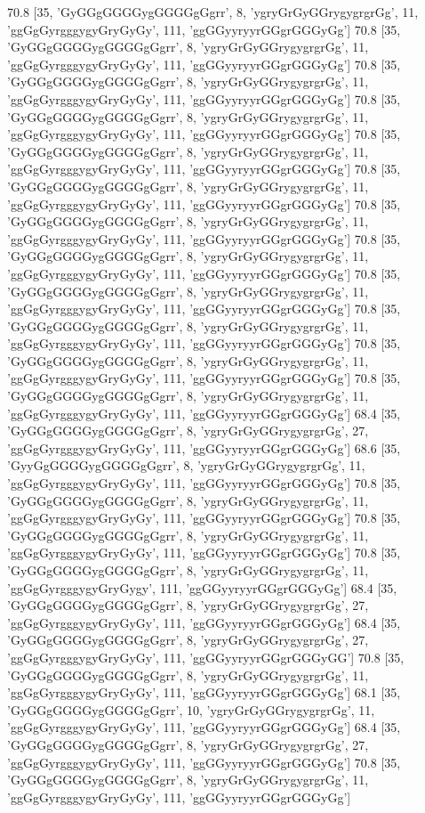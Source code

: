 70.8 [35, 'GyGGgGGGGygGGGGgGgrr', 8, 'ygryGrGyGGrygygrgrGg', 11, 'ggGgGyrgggygyGryGyGy', 111, 'ggGGyyryyrGGgrGGGyGg']
70.8 [35, 'GyGGgGGGGygGGGGgGgrr', 8, 'ygryGrGyGGrygygrgrGg', 11, 'ggGgGyrgggygyGryGyGy', 111, 'ggGGyyryyrGGgrGGGyGg']
70.8 [35, 'GyGGgGGGGygGGGGgGgrr', 8, 'ygryGrGyGGrygygrgrGg', 11, 'ggGgGyrgggygyGryGyGy', 111, 'ggGGyyryyrGGgrGGGyGg']
70.8 [35, 'GyGGgGGGGygGGGGgGgrr', 8, 'ygryGrGyGGrygygrgrGg', 11, 'ggGgGyrgggygyGryGyGy', 111, 'ggGGyyryyrGGgrGGGyGg']
70.8 [35, 'GyGGgGGGGygGGGGgGgrr', 8, 'ygryGrGyGGrygygrgrGg', 11, 'ggGgGyrgggygyGryGyGy', 111, 'ggGGyyryyrGGgrGGGyGg']
70.8 [35, 'GyGGgGGGGygGGGGgGgrr', 8, 'ygryGrGyGGrygygrgrGg', 11, 'ggGgGyrgggygyGryGyGy', 111, 'ggGGyyryyrGGgrGGGyGg']
70.8 [35, 'GyGGgGGGGygGGGGgGgrr', 8, 'ygryGrGyGGrygygrgrGg', 11, 'ggGgGyrgggygyGryGyGy', 111, 'ggGGyyryyrGGgrGGGyGg']
70.8 [35, 'GyGGgGGGGygGGGGgGgrr', 8, 'ygryGrGyGGrygygrgrGg', 11, 'ggGgGyrgggygyGryGyGy', 111, 'ggGGyyryyrGGgrGGGyGg']
70.8 [35, 'GyGGgGGGGygGGGGgGgrr', 8, 'ygryGrGyGGrygygrgrGg', 11, 'ggGgGyrgggygyGryGyGy', 111, 'ggGGyyryyrGGgrGGGyGg']
70.8 [35, 'GyGGgGGGGygGGGGgGgrr', 8, 'ygryGrGyGGrygygrgrGg', 11, 'ggGgGyrgggygyGryGyGy', 111, 'ggGGyyryyrGGgrGGGyGg']
70.8 [35, 'GyGGgGGGGygGGGGgGgrr', 8, 'ygryGrGyGGrygygrgrGg', 11, 'ggGgGyrgggygyGryGyGy', 111, 'ggGGyyryyrGGgrGGGyGg']
70.8 [35, 'GyGGgGGGGygGGGGgGgrr', 8, 'ygryGrGyGGrygygrgrGg', 11, 'ggGgGyrgggygyGryGyGy', 111, 'ggGGyyryyrGGgrGGGyGg']
68.4 [35, 'GyGGgGGGGygGGGGgGgrr', 8, 'ygryGrGyGGrygygrgrGg', 27, 'ggGgGyrgggygyGryGyGy', 111, 'ggGGyyryyrGGgrGGGyGg']
68.6 [35, 'GyyGgGGGGygGGGGgGgrr', 8, 'ygryGrGyGGrygygrgrGg', 11, 'ggGgGyrgggygyGryGyGy', 111, 'ggGGyyryyrGGgrGGGyGg']
70.8 [35, 'GyGGgGGGGygGGGGgGgrr', 8, 'ygryGrGyGGrygygrgrGg', 11, 'ggGgGyrgggygyGryGyGy', 111, 'ggGGyyryyrGGgrGGGyGg']
70.8 [35, 'GyGGgGGGGygGGGGgGgrr', 8, 'ygryGrGyGGrygygrgrGg', 11, 'ggGgGyrgggygyGryGyGy', 111, 'ggGGyyryyrGGgrGGGyGg']
70.8 [35, 'GyGGgGGGGygGGGGgGgrr', 8, 'ygryGrGyGGrygygrgrGg', 11, 'ggGgGyrgggygyGryGygy', 111, 'ggGGyyryyrGGgrGGGyGg']
68.4 [35, 'GyGGgGGGGygGGGGgGgrr', 8, 'ygryGrGyGGrygygrgrGg', 27, 'ggGgGyrgggygyGryGyGy', 111, 'ggGGyyryyrGGgrGGGyGg']
68.4 [35, 'GyGGgGGGGygGGGGgGgrr', 8, 'ygryGrGyGGrygygrgrGg', 27, 'ggGgGyrgggygyGryGyGy', 111, 'ggGGyyryyrGGgrGGGyGG']
70.8 [35, 'GyGGgGGGGygGGGGgGgrr', 8, 'ygryGrGyGGrygygrgrGg', 11, 'ggGgGyrgggygyGryGyGy', 111, 'ggGGyyryyrGGgrGGGyGg']
68.1 [35, 'GyGGgGGGGygGGGGgGgrr', 10, 'ygryGrGyGGrygygrgrGg', 11, 'ggGgGyrgggygyGryGyGy', 111, 'ggGGyyryyrGGgrGGGyGg']
68.4 [35, 'GyGGgGGGGygGGGGgGgrr', 8, 'ygryGrGyGGrygygrgrGg', 27, 'ggGgGyrgggygyGryGyGy', 111, 'ggGGyyryyrGGgrGGGyGg']
70.8 [35, 'GyGGgGGGGygGGGGgGgrr', 8, 'ygryGrGyGGrygygrgrGg', 11, 'ggGgGyrgggygyGryGyGy', 111, 'ggGGyyryyrGGgrGGGyGg']
